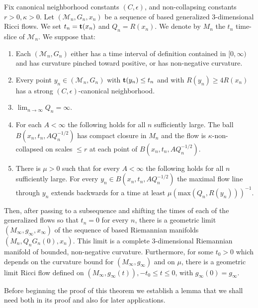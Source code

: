 \begin{theorem}
\label{thm:short-time-blowup-limit}
\label{smlmtflow}
Fix  canonical neighborhood constants $(C,\epsilon)$, and
non-collapsing constants $r>0,\kappa>0$. Let $({\mathcal
M}_n,G_n,x_n)$ be a sequence of based generalized $3$-dimensional
Ricci flows. We set $t_n={\bf t}(x_n)$ and $Q_n=R(x_n)$. We denote
by $M_n$ the $t_n$ time-slice of ${\mathcal M}_n$. We suppose that:
\begin{enumerate}
\item[(1)] Each $({\mathcal M}_n,G_n)$ either has a time interval of definition contained in $[0,\infty)$
and has  curvature pinched toward positive, or has  non-negative curvature.
\item[(2)] Every point $y_n\in ({\mathcal M}_n,G_n)$ with ${\bf t}(y_n)\le
t_n$ and with $R(y_n)\ge 4R(x_n)$ has a strong
$(C,\epsilon)$-canonical neighborhood.
\item[(3)] $\lim_{n\rightarrow\infty}Q_n=\infty$.
\item[(4)] For each $A<\infty$ the following holds for all $n$ sufficiently large. The ball
$B(x_n,t_n,AQ_n^{-1/2})$ has compact closure in $M_n$ and the flow
is $\kappa$-non-collapsed on scales $\le r$ at each point of
$B(x_n,t_n,AQ_n^{-1/2})$.
\item[(5)] There is $\mu>0$ such that for every $A<\infty$ the following holds
 for all $n$ sufficiently large.
For every $y_n\in B(x_n,t_n,AQ_n^{-1/2})$ the maximal flow line
through $y_n$ extends backwards for a time at least $\mu\left(\mathrm{max}(Q_n,R(y_n))\right)^{-1}$.
\end{enumerate}


Then, after passing to a subsequence and shifting the times of each
of the generalized flows so that $t_n=0$ for every $n$, there is a
geometric limit $(M_\infty,g_\infty,x_\infty)$ of the sequence of
based Riemannian manifolds $(M_n,Q_nG_n(0),x_n)$. This limit is a
complete $3$-dimensional Riemannian manifold of bounded,
non-negative curvature. Furthermore, for some $t_0>0$ which depends
on the curvature bound for $(M_\infty,g_\infty)$ and on $\mu$, there
is a geometric limit Ricci flow defined on $(M_\infty,g_\infty(t)),
-t_0\le t\le 0$, with $g_\infty(0)=g_\infty$.
\end{theorem}

Before beginning the proof of this theorem we establish a lemma that
we shall need both in its proof and also for later applications.


